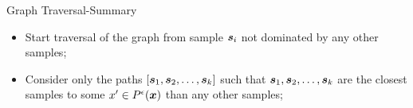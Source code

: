 

\begin{frame}{Graph Traversal-Summary}

    \begin{itemize}
        \item Start traversal of the graph from sample $\sample[i]$ not dominated by any other samples;

        \item Consider only the paths $[\sample[1], \sample[2], \ldots, \sample[k]]$ such that
            $\sample[1], \sample[2], \ldots, \sample[k]$ are the closest samples to some $x' \in P^{\epsilon}(\vinput)$ than any other samples;
    \end{itemize}
\end{frame}


